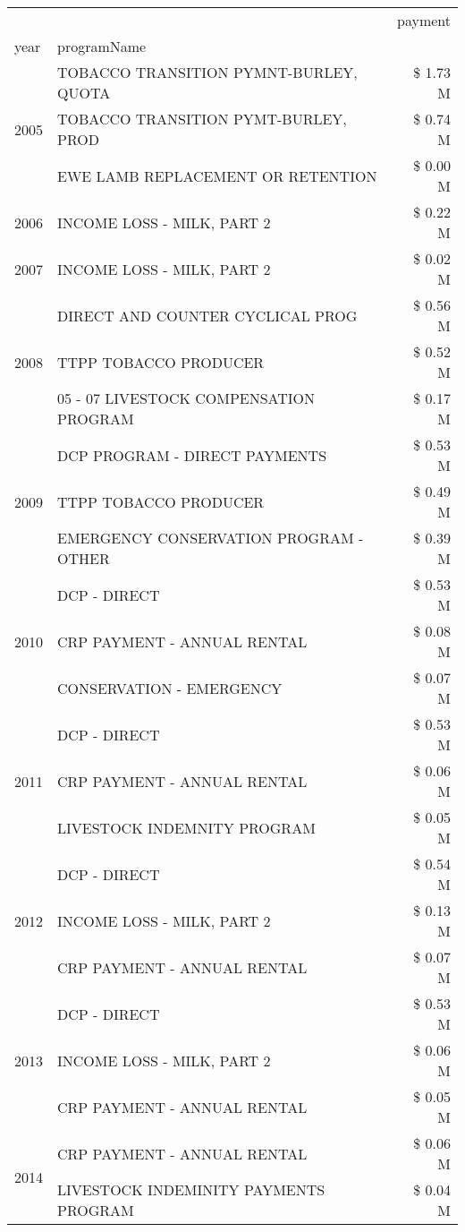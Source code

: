 \begin{tabular}{llr}
\toprule
 &  & payment \\
year & programName &  \\
\midrule
\multirow[t]{3}{*}{2005} & TOBACCO TRANSITION PYMNT-BURLEY, QUOTA & \$ 1.73 M \\
 & TOBACCO TRANSITION PYMT-BURLEY, PROD & \$ 0.74 M \\
 & EWE LAMB REPLACEMENT OR RETENTION & \$ 0.00 M \\
\cline{1-3}
2006 & INCOME LOSS - MILK, PART 2 & \$ 0.22 M \\
\cline{1-3}
2007 & INCOME LOSS - MILK, PART 2 & \$ 0.02 M \\
\cline{1-3}
\multirow[t]{3}{*}{2008} & DIRECT AND COUNTER CYCLICAL PROG & \$ 0.56 M \\
 & TTPP TOBACCO PRODUCER & \$ 0.52 M \\
 & 05 - 07 LIVESTOCK COMPENSATION PROGRAM & \$ 0.17 M \\
\cline{1-3}
\multirow[t]{3}{*}{2009} & DCP PROGRAM - DIRECT PAYMENTS & \$ 0.53 M \\
 & TTPP TOBACCO PRODUCER & \$ 0.49 M \\
 & EMERGENCY CONSERVATION PROGRAM - OTHER & \$ 0.39 M \\
\cline{1-3}
\multirow[t]{3}{*}{2010} & DCP - DIRECT & \$ 0.53 M \\
 & CRP PAYMENT - ANNUAL RENTAL & \$ 0.08 M \\
 & CONSERVATION - EMERGENCY & \$ 0.07 M \\
\cline{1-3}
\multirow[t]{3}{*}{2011} & DCP - DIRECT & \$ 0.53 M \\
 & CRP PAYMENT - ANNUAL RENTAL & \$ 0.06 M \\
 & LIVESTOCK INDEMNITY PROGRAM & \$ 0.05 M \\
\cline{1-3}
\multirow[t]{3}{*}{2012} & DCP - DIRECT & \$ 0.54 M \\
 & INCOME LOSS - MILK, PART 2 & \$ 0.13 M \\
 & CRP PAYMENT - ANNUAL RENTAL & \$ 0.07 M \\
\cline{1-3}
\multirow[t]{3}{*}{2013} & DCP - DIRECT & \$ 0.53 M \\
 & INCOME LOSS - MILK, PART 2 & \$ 0.06 M \\
 & CRP PAYMENT - ANNUAL RENTAL & \$ 0.05 M \\
\cline{1-3}
\multirow[t]{3}{*}{2014} & CRP PAYMENT - ANNUAL RENTAL & \$ 0.06 M \\
 & LIVESTOCK INDEMINITY PAYMENTS PROGRAM & \$ 0.04 M \\

\end{tabular}
